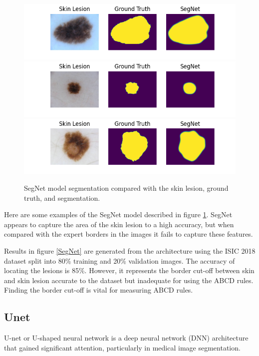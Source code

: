 \begin{figure}[]
    \centering
    \includegraphics[scale=1.0]{images/segmentation/SegNet-1.png}
    \includegraphics[scale=1.0]{images/segmentation/SegNet-2.png}
    \includegraphics[scale=1.0]{images/segmentation/SegNet-3.png}
    \caption{SegNet model segmentation compared with the skin lesion, ground truth, and segmentation.}\label{SegNet-examples}
\end{figure}

Here are some examples of the SegNet model described in figure \ref{SegNet-examples}. SegNet appears to capture the area of the skin lesion to a high accuracy, but when compared with the expert borders in the images it fails to capture these features.

Results in figure \ref{SegNet} are generated from the architecture using the ISIC 2018 dataset split into 80\% training and 20\% validation images. The accuracy of locating the lesions is 85\%. However, it represents the border cut-off between skin and skin lesion accurate to the dataset but inadequate for using the ABCD rules. Finding the border cut-off is vital for measuring ABCD rules\cite{Pereira2020}.

\subsection{Unet}
U-net or U-shaped neural network is a deep neural network (DNN) architecture that gained significant attention, particularly in medical image segmentation. 

